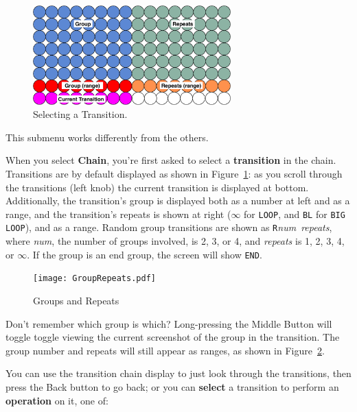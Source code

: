 \documentclass{article}
\begin{document}
\begin{figure}
\vspace{-3.5em}
\hspace{-2.5em}\includegraphics[width=3in]{SelectTransition}
\hspace{-2.5em}\caption{\small Selecting a Transition.~~~~~~~~~~~~~~~~~~~~}
\vspace{3em}
\label{selecttransition}
\end{figure}

\noindent This submenu works differently from the others.  

When you select {\bf Chain}, you're first asked to select a {\bf transition} in the chain.  
Transitions are by default displayed as shown in Figure~\ref{selecttransition}: as you scroll through the transitions (left knob) the current transition is displayed at bottom.  Additionally, the transition's group is displayed both as a number at left and as a range, and the transition's repeats is shown at right (\(\infty\) for \texttt{LOOP}, and {\tt BL} for \texttt{BIG LOOP}), and as a range.  Random group transitions are shown as {\tt R}{\it num}~{\it repeats}, where {\it num}, the number of groups involved, is 2, 3, or 4, and {\it repeats} is 1, 2, 3, 4, or \(\infty\). If the group is an end group, the screen will show {\tt END}.   


\begin{figure}
\vspace{-4em}
\hspace{-2.5em}\texttt{[image: GroupRepeats.pdf]}
\hspace{-2.5em}\caption{\small Groups and Repeats~~~~~~~~~~~~~~~~~~~~}
\label{grouprepeats}
\end{figure}



Don't remember which group is which?  Long-pressing the Middle Button will toggle toggle viewing the current screenshot of the group in the transition.    The group number and repeats will still appear as ranges, as shown in Figure~\ref{grouprepeats}.

You can use the transition chain display to just look through the transitions, then press the Back button to go back; or you can {\bf select} a transition to perform an {\bf operation} on it, one of:
\end{document}
